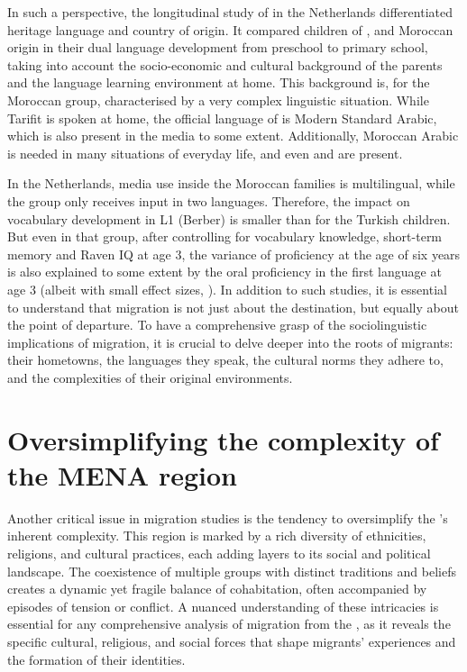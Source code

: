 \documentclass[output=paper,colorlinks,citecolor=brown]{langscibook}
\begin{document}
In such a perspective, the longitudinal study of \citet{leseman_scheele_mayo_messer2009} in the Netherlands differentiated heritage language and country of origin. It compared children of ,  and Moroccan  origin in their dual language development from preschool to primary school, taking into account the socio-economic and cultural background of the parents and the language learning environment at home. This background is, for the Moroccan  group, characterised by a very complex linguistic situation. While Tarifit  is spoken at home, the official language of  is Modern Standard Arabic, which is also present in the media to some extent. Additionally, Moroccan Arabic is needed in many situations of everyday life, and even  and  are present.

In the Netherlands, media use inside the Moroccan families is multilingual, while the  group only receives input in two languages. Therefore, the impact on vocabulary development in L1 (Berber) is smaller than for the Turkish children. But even in that group, after controlling for  vocabulary knowledge, short-term memory and Raven IQ at age 3, the variance of  proficiency at the age of six years is also explained to some extent by the oral proficiency in the first language at age 3 (albeit with small effect sizes, \citealt{leseman_scheele_mayo_messer2009}). In addition to such studies, it is essential to understand that migration is not just about the destination, but equally about the point of departure. To have a comprehensive grasp of the sociolinguistic implications of migration, it is crucial to delve deeper into the roots of migrants: their hometowns, the languages they speak, the cultural norms they adhere to, and the complexities of their original environments. 

\section{Oversimplifying the complexity of the MENA region}\label{Intro.ss.4}

Another critical issue in migration studies is the tendency to oversimplify the 's inherent complexity. This region is marked by a rich diversity of ethnicities, religions, and cultural practices, each adding layers to its social and political landscape. The coexistence of multiple groups with distinct traditions and beliefs creates a dynamic yet fragile balance of cohabitation, often accompanied by episodes of tension or conflict. A nuanced understanding of these intricacies is essential for any comprehensive analysis of migration from the , as it reveals the specific cultural, religious, and social forces that shape migrants' experiences and the formation of their identities. 
\end{document}
